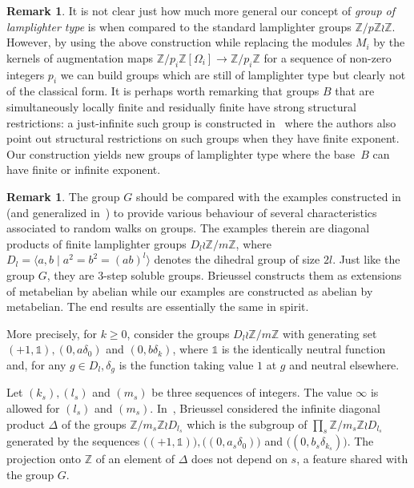 \documentclass[11pt]{article}
\theoremstyle{definition}
\newtheorem{rema}[theo]{Remark}
\numberwithin{equation}{section}
\numberwithin{figure}{section}
\numberwithin{table}{section}
\newcommand{\Z}{\mathbb{Z}}
\begin{document}
\begin{rema}
It is not clear just how much more general our concept of \emph{group of lamplighter type} is when compared to the standard lamplighter groups $\Z/p\Z\wr\Z$. However, by using the above construction while replacing the modules $M_i$ by the kernels of augmentation maps $\Z/p_i\Z[\Omega_i]\to\Z/p_i\Z$ for a sequence of non-zero integers $p_i$ we can build groups which are still of lamplighter type but clearly not of the classical form. It is perhaps worth remarking that groups $B$ that are simultaneously locally finite and residually finite have strong structural restrictions: a just-infinite such group is constructed in~\cite{BGS} where the authors also point out structural restrictions on such groups when they have finite exponent. Our construction yields new groups of lamplighter type where the base~$B$ can have finite or infinite exponent.
\end{rema}


\begin{rema}
The group $G$ should be compared with the examples constructed in~\cite{Brieussel} (and generalized in~\cite{BZ}) to provide various behaviour of several characteristics associated to random walks on groups. The examples therein are diagonal products of finite lamplighter groups $D_l \wr\Z/m\Z$, where $D_l= \langle a, b \mid a^2=b^2=(ab)^l\rangle$ denotes the dihedral group of size $2l$. Just like the group $G$, they are $3$-step soluble groups. Brieussel constructs them as extensions of metabelian by abelian while our examples are constructed as abelian by metabelian. The end results are essentially the same in spirit.

More precisely, for $k \geq 0$, consider the groups $D_l \wr\Z/m\Z$ with generating set $(+1, \mathbb{1}), (0, a\delta_0)$ and $(0, b\delta_{k})$, where $\mathbb 1$ is the identically neutral function and, for any $g\in D_l, \delta_g$ is the function taking value $1$ at $g$ and neutral elsewhere.

Let $(k_s), (l_s)$ and $(m_s)$ be three sequences of integers. The value $\infty$ is allowed for $(l_s)$ and $(m_s)$. In~\cite{Brieussel}, Brieussel considered the infinite diagonal product $\Delta$ of the groups $\Z/m_s\Z \wr D_{l_s}$ which is the subgroup of $\prod_s \Z/m_s\Z \wr D_{l_s}$ generated by the sequences $\big((+1, \mathbb 1)\big), \big((0, a_s\delta_0)\big)$ and $ \big((0, b_s\delta_{k_s})\big)$. The projection onto $\Z$ of an element of $\Delta$ does not depend on $s$, a feature shared with the group $G$.
\end{rema}
\end{document}
